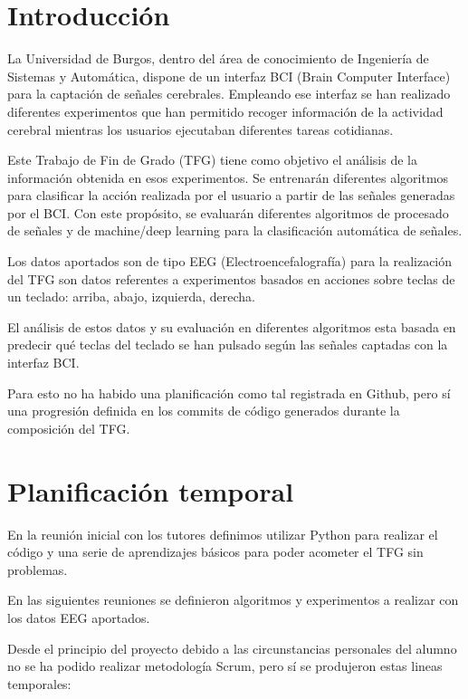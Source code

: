 
\section{Introducción}

La Universidad de Burgos, dentro del área de conocimiento de Ingeniería de Sistemas y Automática, dispone de un interfaz BCI (Brain Computer Interface) para la captación de señales cerebrales. 
Empleando ese interfaz se han realizado diferentes experimentos que han permitido recoger información de la actividad cerebral mientras los usuarios ejecutaban diferentes tareas cotidianas. 

Este Trabajo de Fin de Grado (TFG) tiene como objetivo el análisis de la información obtenida en esos experimentos. Se entrenarán diferentes algoritmos para clasificar la acción realizada por el usuario a partir de las señales generadas por el BCI. Con este propósito, se evaluarán diferentes algoritmos de procesado de señales y de machine/deep learning para la clasificación automática de señales.

Los datos aportados son de tipo EEG (Electroencefalografía) para la realización del TFG son datos referentes a experimentos basados en acciones sobre teclas de un teclado: arriba, abajo, izquierda, derecha.

El análisis de estos datos y su evaluación en diferentes algoritmos esta basada en predecir qué teclas del teclado se han pulsado según las señales captadas con la interfaz BCI.

Para esto no ha habido una planificación como tal registrada en Github, pero sí una progresión definida en los commits de código generados durante la composición del TFG.

\section{Planificación temporal}


En la reunión inicial con los tutores definimos utilizar Python para realizar el código y una serie de aprendizajes básicos para poder acometer el TFG sin problemas.

En las siguientes reuniones se definieron algoritmos y experimentos a realizar con los datos EEG aportados.

Desde el principio del proyecto debido a las circunstancias personales del alumno no se ha podido realizar metodología Scrum, pero sí se produjeron estas lineas temporales:

